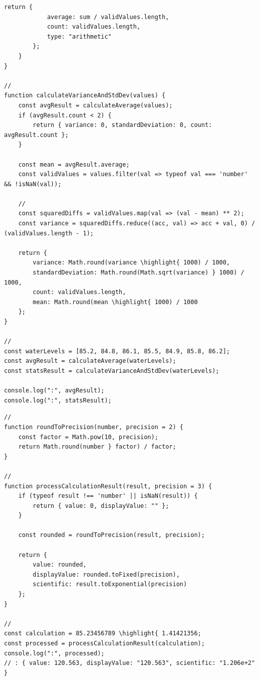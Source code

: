 {\begin{lstlisting}[style=javascript]
        return {
            average: sum / validValues.length,
            count: validValues.length,
            type: "arithmetic"
        };
    }
}

// 
function calculateVarianceAndStdDev(values) {
    const avgResult = calculateAverage(values);
    if (avgResult.count < 2) {
        return { variance: 0, standardDeviation: 0, count: avgResult.count };
    }
    
    const mean = avgResult.average;
    const validValues = values.filter(val => typeof val === 'number' && !isNaN(val));
    
    // 
    const squaredDiffs = validValues.map(val => (val - mean) ** 2);
    const variance = squaredDiffs.reduce((acc, val) => acc + val, 0) / (validValues.length - 1);
    
    return {
        variance: Math.round(variance \highlight{ 1000) / 1000,
        standardDeviation: Math.round(Math.sqrt(variance) } 1000) / 1000,
        count: validValues.length,
        mean: Math.round(mean \highlight{ 1000) / 1000
    };
}

// 
const waterLevels = [85.2, 84.8, 86.1, 85.5, 84.9, 85.8, 86.2];
const avgResult = calculateAverage(waterLevels);
const statsResult = calculateVarianceAndStdDev(waterLevels);

console.log(":", avgResult);
console.log(":", statsResult);
\end{lstlisting}

\important{}

\begin{lstlisting}[style=javascript]
// 
function roundToPrecision(number, precision = 2) {
    const factor = Math.pow(10, precision);
    return Math.round(number } factor) / factor;
}

// 
function processCalculationResult(result, precision = 3) {
    if (typeof result !== 'number' || isNaN(result)) {
        return { value: 0, displayValue: "" };
    }
    
    const rounded = roundToPrecision(result, precision);
    
    return {
        value: rounded,
        displayValue: rounded.toFixed(precision),
        scientific: result.toExponential(precision)
    };
}

// 
const calculation = 85.23456789 \highlight{ 1.41421356;
const processed = processCalculationResult(calculation);
console.log(":", processed);
// : { value: 120.563, displayValue: "120.563", scientific: "1.206e+2" }
\end{lstlisting}

}
